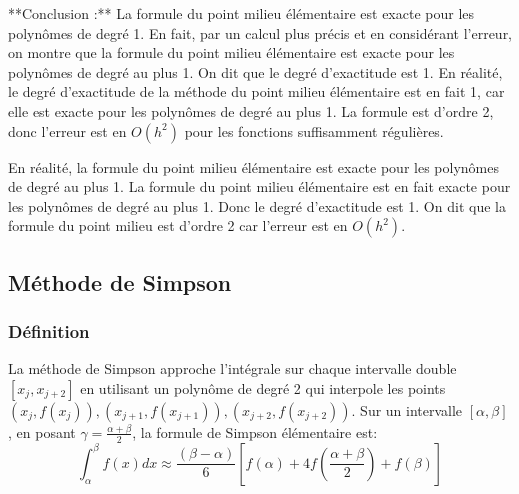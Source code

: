 \documentclass{article}
\begin{document}
**Conclusion :** La formule du point milieu élémentaire est exacte pour les polynômes de degré 1. En fait, par un calcul plus précis et en considérant l'erreur, on montre que la formule du point milieu élémentaire est exacte pour les polynômes de degré au plus 1. On dit que le degré d'exactitude est 1. En réalité, le degré d'exactitude de la méthode du point milieu élémentaire est en fait 1, car elle est exacte pour les polynômes de degré au plus 1. La formule est d'ordre 2, donc l'erreur est en $O(h^2)$ pour les fonctions suffisamment régulières.

En réalité, la formule du point milieu élémentaire est exacte pour les polynômes de degré au plus 1.  La formule du point milieu élémentaire est en fait exacte pour les polynômes de degré au plus 1.  Donc le degré d'exactitude est 1. On dit que la formule du point milieu est d'ordre 2 car l'erreur est en $O(h^2)$.

\subsection{Méthode de Simpson}

\subsubsection{Définition}

La méthode de Simpson approche l'intégrale sur chaque intervalle double $[x_j, x_{j+2}]$ en utilisant un polynôme de degré 2 qui interpole les points $(x_j, f(x_j)), (x_{j+1}, f(x_{j+1})), (x_{j+2}, f(x_{j+2}))$.  Sur un intervalle $[\alpha, \beta]$, en posant $\gamma = \frac{\alpha + \beta}{2}$, la formule de Simpson élémentaire est:
\[ \int_{\alpha}^{\beta} f(x) dx \approx \frac{(\beta - \alpha)}{6} \left[f(\alpha) + 4f\left(\frac{\alpha + \beta}{2}\right) + f(\beta)\right] \]
\end{document}
